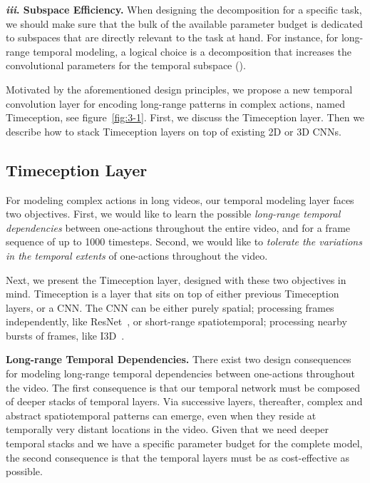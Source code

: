 \documentclass[10pt,twocolumn,letterpaper]{article}
\newcommand{\partitle}[1]{\noindent\textbf{#1}}
\begin{document}
\partitle{\textit{iii}. Subspace Efficiency.}
When designing the decomposition for a specific task, we should make sure that the bulk of the available parameter budget is dedicated to subspaces that are directly relevant to the task at hand.
For instance, for long-range temporal modeling, a logical choice is a decomposition that increases the convolutional parameters for the temporal subspace ().

Motivated by the aforementioned design principles, we propose a new temporal convolution layer for encoding long-range patterns in complex actions, named Timeception, see figure~\ref{fig:3-1}.
First, we discuss the Timeception layer.
Then we describe how to stack Timeception layers on top of existing 2D or 3D CNNs.

\subsection{Timeception Layer}
For modeling complex actions in long videos, our temporal modeling layer faces two objectives.
First, we would like to learn the possible \emph{long-range temporal dependencies} between one-actions throughout the entire video, and for a frame sequence of up to 1000 timesteps.
Second, we would like to \emph{tolerate the variations in the temporal extents} of one-actions throughout the video.

Next, we present the Timeception layer, designed with these two objectives in mind.
Timeception is a layer that sits on top of either previous Timeception layers, or a CNN.
The CNN can be either purely spatial; processing frames independently, like ResNet~\cite{he2016deep}, or short-range spatiotemporal; processing nearby bursts of frames, like I3D~\cite{carreira2017quo}.

\partitle{Long-range Temporal Dependencies.}
There exist two design consequences for modeling long-range temporal dependencies between one-actions throughout the video. The first consequence is that our temporal network must be composed of deeper stacks of temporal layers.
Via successive layers, thereafter, complex and abstract spatiotemporal patterns can emerge, even when they reside at temporally very distant locations in the video.
Given that we need deeper temporal stacks and we have a specific parameter budget for the complete model, the second consequence is that the temporal layers must be as cost-effective as possible.
\end{document}
